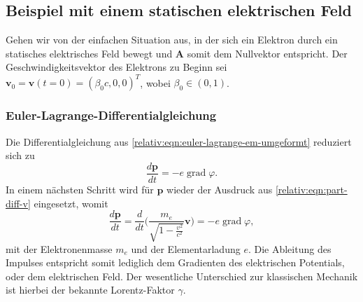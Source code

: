 \subsection{Beispiel mit einem statischen elektrischen Feld
\label{relativ:section:teilchen-konst-e-feld}}

Gehen wir von der einfachen Situation aus,
in der sich ein Elektron durch ein statisches
elektrisches Feld bewegt und \(\bm{A}\)
somit dem Nullvektor entspricht.
Der Geschwindigkeitsvektor des Elektrons zu Beginn sei
\(\bm{v}_0 = \bm{v}(t=0) =(\beta_0 c, 0, 0)^T\), wobei
\(\beta_0 \in (0, 1)\).

\subsubsection{Euler-Lagrange-Differentialgleichung}
Die Differentialgleichung aus \eqref{relativ:eqn:euler-lagrange-em-umgeformt} reduziert sich zu
\begin{equation}
    \frac{d\bm{p}}{dt} =
    - e \operatorname{grad} \varphi.
    \label{relativ:eqn:euler-lagrange-bsp-1}
\end{equation}
In einem nächsten Schritt wird für \(\bm{p}\)
wieder der Ausdruck aus \eqref{relativ:eqn:part-diff-v} eingesetzt,
womit
\begin{equation}
    \frac{d\bm{p}}{dt} =
    \frac{d}{dt} \Biggl(\frac{m_e}{\sqrt{1-\frac{v^2}{c^2}}} \bm{v}\Biggr) =
    - e \operatorname{grad} \varphi,
    \label{relativ:eqn:euler-lagrange-bsp-eingesetzt}
\end{equation}
mit der Elektronenmasse \(m_e\) und der Elementarladung \(e\).
%
%
%
Die Ableitung des Impulses entspricht somit lediglich
dem Gradienten des elektrischen Potentials, oder dem elektrischen Feld.
Der wesentliche Unterschied zur klassischen Mechanik ist hierbei
der bekannte Lorentz-Faktor \(\gamma\).

